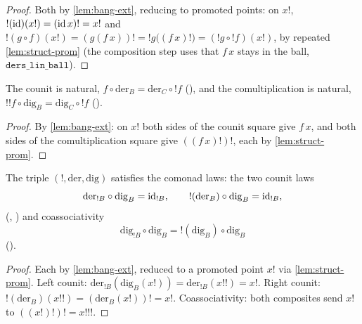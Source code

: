\begin{proof}
Both by \autoref{lem:bang-ext}, reducing to promoted points: on $x!$,
$\mathord{!}(\mathrm{id})(x!) = (\mathrm{id}\,x)! = x!$ and $\mathord{!}(g \circ f)(x!)
= (g(f\,x))! = \mathord{!}g\bigl((f\,x)!\bigr) = (\mathord{!}g \circ
\mathord{!}f)(x!)$, by repeated \autoref{lem:struct-prom} (the
composition step uses that $f\,x$ stays in the ball, $\texttt{ders\_lin\_ball}$).
\end{proof}

\begin{lemma}\label{lem:der-dig-nat}
\rocqok
{}\rocqok
{}
The counit is natural, $f \circ \mathrm{der}_B = \mathrm{der}_C \circ
\mathord{!}f$ (), and the
comultiplication is natural, $\mathord{!}\mathord{!}f \circ
\mathrm{dig}_B = \mathrm{dig}_C \circ \mathord{!}f$
().
\end{lemma}

\begin{proof}
By \autoref{lem:bang-ext}: on $x!$ both sides of the counit square give
$f\,x$, and both sides of the comultiplication square give
$((f\,x)!)!$, each by \autoref{lem:struct-prom}.
\end{proof}

\begin{theorem}\label{thm:comonad}
\rocqok
{}\rocqok
{}\rocqok
{}
The triple $(\mathord{!}, \mathrm{der}, \mathrm{dig})$ satisfies the
comonad laws: the two counit laws
\[
  \mathrm{der}_{\mathord{!}B} \circ \mathrm{dig}_B = \mathrm{id}_{\mathord{!}B},
  \qquad
  \mathord{!}(\mathrm{der}_B) \circ \mathrm{dig}_B = \mathrm{id}_{\mathord{!}B},
\]
(,
) and coassociativity
\[
  \mathrm{dig}_{\mathord{!}B} \circ \mathrm{dig}_B
  = \mathord{!}(\mathrm{dig}_B) \circ \mathrm{dig}_B
\]
().
\end{theorem}

\begin{proof}
Each by \autoref{lem:bang-ext}, reduced to a promoted point $x!$ via
\autoref{lem:struct-prom}. Left counit:
$\mathrm{der}_{\mathord{!}B}(\mathrm{dig}_B(x!)) =
\mathrm{der}_{\mathord{!}B}(x!!) = x!$. Right counit:
$\mathord{!}(\mathrm{der}_B)(x!!) = (\mathrm{der}_B(x!))! = x!$.
Coassociativity: both composites send $x!$ to $((x!)!)! = x!!!$.
\end{proof}

